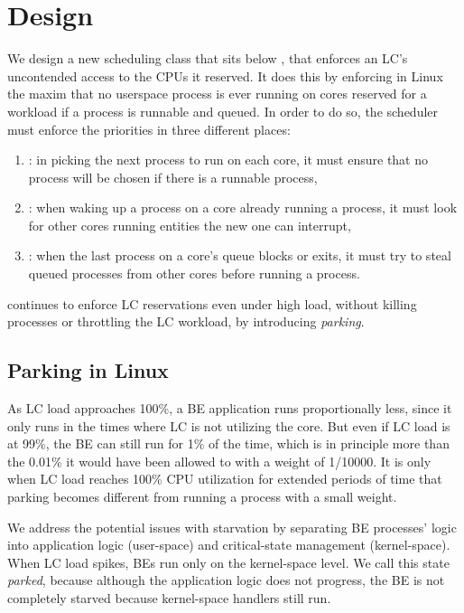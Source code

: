 \section{Design}\label{s:design}

We design a new scheduling class \beclass{} that sits below \schednormal{}, that
enforces an LC's uncontended access to the CPUs it reserved. It does this by
enforcing in Linux the maxim that no \beclass{} userspace process is ever
running on cores reserved for a \normalclass{} workload if a \normalclass{}
process is runnable and queued. In order to do so, the scheduler must enforce
the priorities in three different places:
\begin{enumerate}
    \item \local: in picking the next process to run on each core, it must ensure
        that no \beclass{} process will be chosen if there is a runnable
        \normalclass{} process,
    \item \entry: when waking up a \normalclass{} process on a core already
        running a \normalclass{} process, it must look for other cores running
        \beclass{} entities the new one can interrupt,
    \item \exit: when the last \normalclass{} process on a core's queue blocks
        or exits, it must try to steal queued \normalclass{} processes from
        other cores before running a \beclass{} process.
\end{enumerate}


\beclass{} continues to enforce LC reservations even under high load, without
killing \beclass{} processes or throttling the LC workload, by introducing
\textit{parking}.

\subsection{Parking in Linux}

As LC load approaches 100\%, a BE application runs proportionally less, since it
only runs in the times where LC is not utilizing the core. But even if LC load
is at 99\%, the BE can still run for 1\% of the time, which is in principle more
than the 0.01\% it would have been allowed to with a weight of 1/10000. It is
only when LC load reaches 100\% CPU utilization for extended periods of time
that parking becomes different from running a process with a small weight.

We address the potential issues with starvation by separating BE processes'
logic into application logic (user-space) and critical-state management
(kernel-space). When LC load spikes, BEs run only on the kernel-space level. We
call this state \textit{parked}, because although the application logic does not
progress, the BE is not completely starved because kernel-space handlers still
run.

